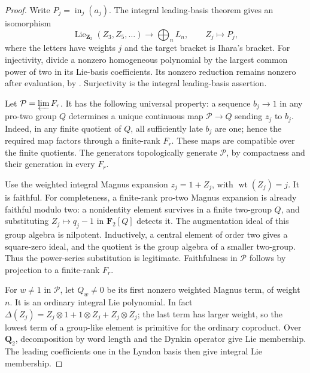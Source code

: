 \begin{proof}
Write \(P_j=\operatorname{in}_j(a_j)\).
The integral leading-basis theorem gives an isomorphism
\begin{equation}
 \operatorname{Lie}_{\mathbf Z_2}(Z_3,Z_5,\ldots)
 \longrightarrow\bigoplus_n L_n,\qquad Z_j\longmapsto P_j,
                                                               \label{eq:normalized-protwo-2}
\end{equation}
where the letters have weights \(j\) and the target bracket is
Ihara's bracket.
For injectivity, divide a nonzero homogeneous polynomial by the
largest common power of two in its Lie-basis coefficients.
Its nonzero reduction remains nonzero after evaluation, by
\cite[Theorem~1.3]{Willwacher}.
Surjectivity is the integral leading-basis assertion.

Let \(\mathcal P=\varprojlim F_r\).
It has the following universal property: a sequence \(b_j\to1\)
in any pro-two group \(Q\) determines a unique continuous map
\(\mathcal P\to Q\) sending \(z_j\) to \(b_j\).
Indeed, in any finite quotient of \(Q\), all sufficiently late
\(b_j\) are one; hence the required map factors through a
finite-rank \(F_r\). These maps are compatible over the finite
quotients. The generators topologically generate \(\mathcal P\),
by compactness and their generation in every \(F_r\).

Use the weighted integral Magnus expansion \(z_j=1+Z_j\), with
\(\operatorname{wt}(Z_j)=j\). It is faithful.
For completeness, a finite-rank pro-two Magnus expansion is
already faithful modulo two: a nonidentity element survives in
a finite two-group \(Q\), and substituting \(Z_j\mapsto q_j-1\)
in \(\mathbf F_2[Q]\) detects it.
The augmentation ideal of this group algebra is nilpotent.
Inductively, a central element of order two gives a square-zero
ideal, and the quotient is the group algebra of a smaller
two-group. Thus the power-series substitution is legitimate.
Faithfulness in \(\mathcal P\) follows by projection to a
finite-rank \(F_r\).

For \(w\ne1\) in \(\mathcal P\), let \(Q_w\ne0\) be its first
nonzero weighted Magnus term, of weight \(n\).
It is an ordinary integral Lie polynomial.
In fact
\(\Delta(Z_j)=Z_j\otimes1+1\otimes Z_j+Z_j\otimes Z_j\);
the last term has larger weight, so the lowest term of a
group-like element is primitive for the ordinary coproduct.
Over \(\mathbf Q_2\), decomposition by word length and the
Dynkin operator give Lie membership.
The leading coefficients one in the Lyndon basis then give
integral Lie membership.


\end{proof}

